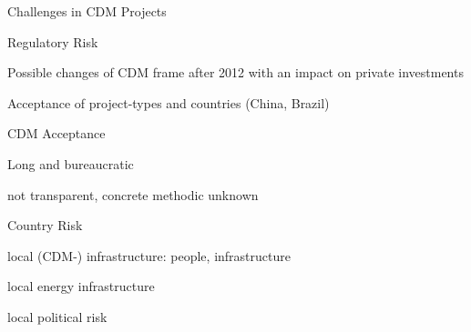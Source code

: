 {Challenges in CDM Projects}
\item<1-> Regulatory  Risk
\item Possible changes of CDM frame after 2012 with an impact on private investments
\item Acceptance of project-types and countries (China, Brazil)
\item<2-> CDM Acceptance
\item Long and bureaucratic
\item not transparent, concrete methodic unknown
\item<3-> Country Risk
\item local (CDM-) infrastructure: people, infrastructure
\item local energy infrastructure
\item local political risk


